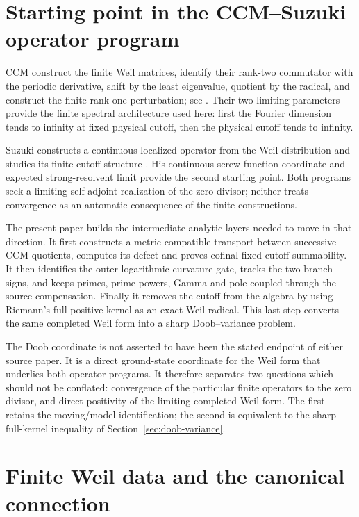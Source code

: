 \documentclass[11pt]{amsart}
\theoremstyle{definition}
\theoremstyle{remark}
\begin{document}
\section{Starting point in the CCM--Suzuki operator program}
\label{sec:boundary}

CCM construct the finite Weil matrices, identify their rank-two commutator
with the periodic derivative, shift by the least eigenvalue, quotient by the
radical, and construct the finite rank-one perturbation; see
\cite[Section~5, especially Lemma~5.4 and Theorem~5.10]{CCM}.  Their two
limiting parameters provide the finite spectral architecture used here:
first the Fourier dimension tends to infinity at fixed physical cutoff,
then the physical cutoff tends to infinity.

Suzuki constructs a continuous localized operator from the Weil
distribution and studies its finite-cutoff structure \cite{Suzuki}.  His
continuous screw-function coordinate and expected strong-resolvent limit
provide the second starting point.  Both programs seek a limiting
self-adjoint realization of the zero divisor; neither treats convergence as
an automatic consequence of the finite constructions.

The present paper builds the intermediate analytic layers needed to move in
that direction.  It first constructs a metric-compatible transport between
successive CCM quotients, computes its defect and proves cofinal fixed-cutoff
summability.  It then identifies the outer logarithmic-curvature gate,
tracks the two branch signs, and keeps primes, prime powers, Gamma and pole
coupled through the source compensation.  Finally it removes the cutoff
from the algebra by using Riemann's full positive kernel as an exact Weil
radical.  This last step converts the same completed Weil form into a sharp
Doob--variance problem.

The Doob coordinate is not asserted to have been the stated endpoint of
either source paper.  It is a direct ground-state coordinate for the Weil
form that underlies both operator programs.  It therefore separates two
questions which should not be conflated: convergence of the particular
finite operators to the zero divisor, and direct positivity of the limiting
completed Weil form.  The first retains the moving/model identification;
the second is equivalent to the sharp full-kernel inequality of
Section~\ref{sec:doob-variance}.

\section{Finite Weil data and the canonical connection}
\label{sec:finite}
\end{document}
